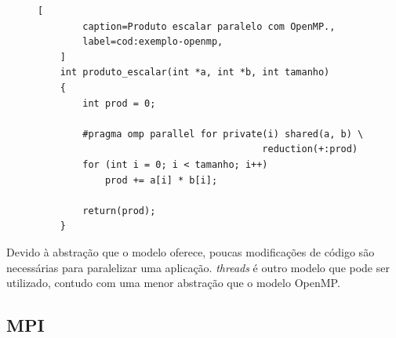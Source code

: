 \begin{figure}[t]
	\begin{lstlisting}[
		caption=Produto escalar paralelo com OpenMP.,
		label=cod:exemplo-openmp,
	]
	int produto_escalar(int *a, int *b, int tamanho)
	{
		int prod = 0;

		#pragma omp parallel for private(i) shared(a, b) \
                                        reduction(+:prod)
		for (int i = 0; i < tamanho; i++)
			prod += a[i] * b[i];

		return(prod);
	}
	\end{lstlisting}
\end{figure}

Devido à abstração que o modelo oferece, poucas modificações de código são
necessárias para paralelizar uma aplicação. \posix \textit{threads} é outro
modelo que pode ser utilizado, contudo com uma menor abstração que o modelo
OpenMP.


\subsection{MPI}

